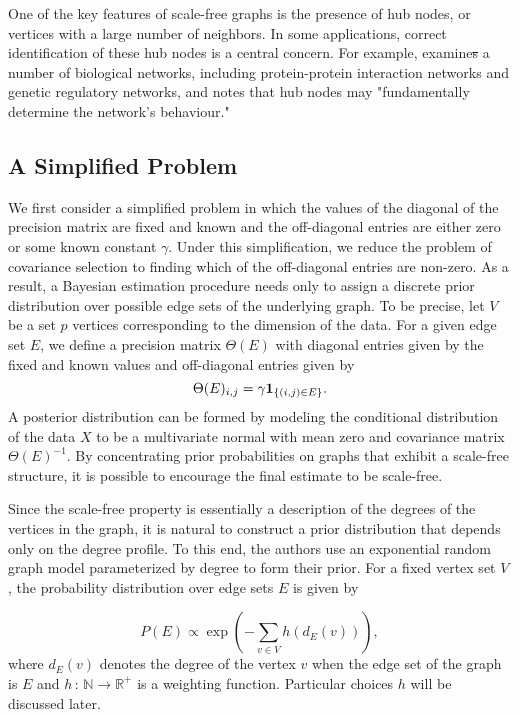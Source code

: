 \documentclass{uwstat572}
\newcommand{\vmdel}[1]{\sout{#1}}
\newcommand{\vmadd}[1]{\textbf{\color{red}{#1}}}
\theoremstyle{remark}
\theoremstyle{definition}
\begin{document}
One of the key features of scale-free graphs is the presence of hub nodes, or vertices with a large number of neighbors.  In some applications, correct identification of these hub nodes is a central concern.  For example, \cite{barabasi2004network} examine\vmdel{s} a number of biological networks, including protein-protein interaction networks and genetic regulatory networks, and notes that hub nodes may "fundamentally determine the network's behaviour."



\subsection{A Simplified Problem}

We first consider a simplified problem in which the values of the diagonal of the precision matrix are fixed and known and the off-diagonal entries are either zero or \vmadd{are equal to} some known constant $\gamma$.  
Under this simplification, we reduce the problem of covariance selection to finding which of the off-diagonal entries are non-zero.  As a result, a Bayesian estimation procedure needs only to assign a discrete prior distribution over possible edge sets of the underlying graph. To be precise, let $V$ be a set $p$ vertices corresponding to the dimension of the data.  For a given edge set $E$, we define a precision matrix $\Theta(E)$ with diagonal entries given by the fixed and known values and off-diagonal entries given by
\begin{equation*}
    \Theta(E)_{i,j} = \gamma {\bf{1}}_{\{(i,j) \in E\}}.
\end{equation*}
A posterior distribution can be formed by modeling the conditional distribution of the data $X$ to be a multivariate normal with mean zero and covariance matrix $\Theta(E)^{-1}$.  By concentrating prior probabilities on graphs that exhibit a scale-free structure, it is possible to encourage the final estimate to be scale-free.

Since the scale-free property is essentially a description of the degrees of the vertices in the graph, it is natural to construct a prior distribution that depends only on the degree profile.  To this end, the authors use an exponential random graph model parameterized by degree to form their prior.  For a fixed vertex set $V$, the probability distribution over edge sets $E$ is given by

\begin{equation}\label{cprior}
P( E ) \propto \exp \left( - \sum_{v \in V} h(d_E(v)) \right),
\end{equation}
where $d_E(v)$ denotes the degree of the vertex $v$ when the edge set of the graph is $E$ and $h \, : \, \mathbb{N} \to \mathbb{R}^+$ is a weighting function.  Particular choices $h$ will be discussed later.
\end{document}

